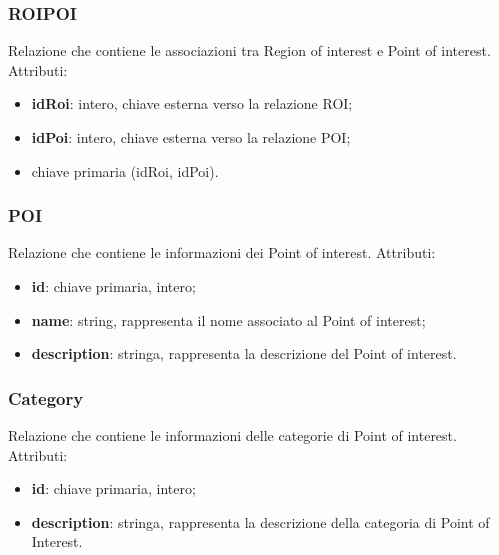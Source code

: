 \documentclass[../ManualeSviluppatore.tex]{subfiles}
\begin{document}
		\subsubsection{ROIPOI}
		Relazione che contiene le associazioni tra Region of interest e Point of interest. Attributi:
			\begin{itemize}
			\item \textbf{idRoi}: intero, chiave esterna verso la relazione ROI;
			\item \textbf{idPoi}: intero, chiave esterna verso la relazione POI;
			\item chiave primaria (idRoi, idPoi).
			\end{itemize}
		\subsubsection{POI}
		Relazione che contiene le informazioni dei Point of interest. Attributi:
			\begin{itemize}
			\item \textbf{id}: chiave primaria, intero;
			\item \textbf{name}: string, rappresenta il nome associato al Point of interest;
			\item \textbf{description}: stringa, rappresenta la descrizione del Point of interest.
			\end{itemize}
		\subsubsection{Category}
		Relazione che contiene le informazioni delle categorie di Point of interest. Attributi:
			\begin{itemize}
			\item \textbf{id}: chiave primaria, intero;
			\item \textbf{description}: stringa, rappresenta la descrizione della categoria di Point of Interest.
			\end{itemize}
\end{document}
